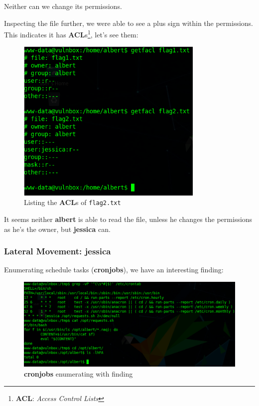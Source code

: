 \documentclass[12pt]{article}
\begin{document}
    Neither can we change its permissions.

    Inspecting the file further, we were able to see a plus sign within the
    permissions. This indicates it has \textbf{ACL}s\footnote{\textbf{ACL}:
    \textit{Access Control Lists}}, let's see them:

    \begin{figure}[H]\label{pic:50-getfacl}
        \centering
        \includegraphics[width=0.80\textwidth]{50-getfacl.png}
        \caption{Listing the \textbf{ACL}s of \texttt{flag2.txt}}
    \end{figure}

    It seems neither \textbf{albert} is able to read the file, unless he
    changes the permissions as he's the owner, but \textbf{jessica} can.

\pagebreak
\subsubsection{Lateral Movement: jessica}

    Enumerating schedule tasks (\textbf{cronjobs}), we have an interesting
    finding:

    \begin{figure}[H]\label{pic:51-enumerating-cronjobs}
        \centering
        \includegraphics[width=1.00\textwidth]{51-enumerating-cronjobs.png}
        \caption{\textbf{cronjobs} enumerating with finding}
    \end{figure}
\end{document}
